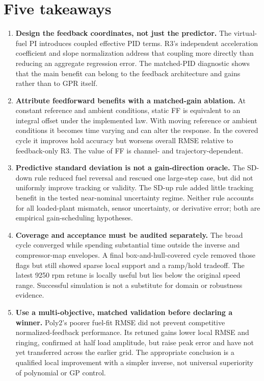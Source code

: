 \documentclass[11pt,a4paper,oneside]{report}
\begin{document}
\section{Five takeaways}
\begin{enumerate}[label=\textbf{\arabic*.},leftmargin=*]
\item \textbf{Design the feedback coordinates, not just the predictor.} The virtual-fuel PI introduces coupled effective PID terms. R3's independent acceleration coefficient and slope normalization address that coupling more directly than reducing an aggregate regression error. The matched-PID diagnostic shows that the main benefit can belong to the feedback architecture and gains rather than to GPR itself.

\item \textbf{Attribute feedforward benefits with a matched-gain ablation.} At constant reference and ambient conditions, static FF is equivalent to an integral offset under the implemented law. With moving reference or ambient conditions it becomes time varying and can alter the response. In the covered cycle it improves hold accuracy but worsens overall RMSE relative to feedback-only R3. The value of FF is channel- and trajectory-dependent.

\item \textbf{Predictive standard deviation is not a gain-direction oracle.} The SD-down rule reduced fuel reversal and rescued one large-step case, but did not uniformly improve tracking or validity. The SD-up rule added little tracking benefit in the tested near-nominal uncertainty regime. Neither rule accounts for all loaded-plant mismatch, sensor uncertainty, or derivative error; both are empirical gain-scheduling hypotheses.

\item \textbf{Coverage and acceptance must be audited separately.} The broad cycle converged while spending substantial time outside the inverse and compressor-map envelopes. A final box-and-hull-covered cycle removed those flags but still showed sparse local support and a ramp/hold tradeoff. The latest 9250 rpm retune is locally useful but lies below the original speed range. Successful simulation is not a substitute for domain or robustness evidence.

\item \textbf{Use a multi-objective, matched validation before declaring a winner.} Poly2's poorer fuel-fit RMSE did not prevent competitive normalized-feedback performance. Its retuned gains lower local RMSE and ringing, confirmed at half load amplitude, but raise peak error and have not yet transferred across the earlier grid. The appropriate conclusion is a qualified local improvement with a simpler inverse, not universal superiority of polynomial or GP control.
\end{enumerate}
\end{document}
